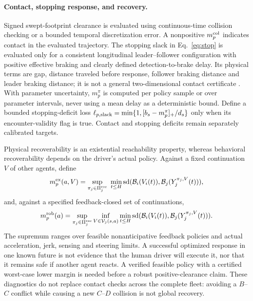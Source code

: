 \documentclass[10pt]{article}
\begin{document}
\paragraph{Contact, stopping response, and recovery.}
Signed swept-footprint clearance is evaluated using continuous-time collision checking or a bounded temporal discretization error. A nonpositive $m_p^{\rm col}$ indicates contact in the evaluated trajectory. The stopping slack in Eq.~\eqref{eq:stop} is evaluated only for a consistent longitudinal leader--follower configuration with positive effective braking and clearly defined detection-to-brake delay. Its physical terms are gap, distance traveled before response, follower braking distance and leader braking distance; it is not a general two-dimensional contact certificate \parencite{shalev2017rss,durrani2024new}. With parameter uncertainty, $m_p^\pi$ is computed per policy sample or over parameter intervals, never using a mean delay as a deterministic bound. Define a bounded stopping-deficit loss $\ell_{p,\rm slack}=\min\{1,[b_s-m_p^\pi]_+/d_s\}$ only when its encounter-validity flag is true. Contact and stopping deficits remain separately calibrated targets.

Physical recoverability is an existential reachability property, whereas behavioral recoverability depends on the driver's actual policy. Against a fixed continuation $V$ of other agents, define
\begin{equation}
 m_p^{\rm ex}(a,V)=\sup_{\pi_j\in\Pi_j^{\rm rec}}\ \min_{t\le H}
 \operatorname{sd}(\mathcal B_i(V_i(t)),\mathcal B_j(Y_j^{\pi_j,V}(t))),
 \label{eq:exrecover}
\end{equation}
and, against a specified feedback-closed set of continuations,
\begin{equation}
 m_p^{\rm rob}(a)=\sup_{\pi_j\in\Pi_j^{\rm rec}}
 \inf_{V\in\mathcal V_j(s,a)}\min_{t\le H}
 \operatorname{sd}(\mathcal B_i(V_i(t)),\mathcal B_j(Y_j^{\pi_j,V}(t))).
 \label{eq:robrecover}
\end{equation}
The supremum ranges over feasible nonanticipative feedback policies and actual acceleration, jerk, sensing and steering limits. A successful optimized response in one known future is not evidence that the human driver will execute it, nor that it remains safe if another agent reacts. A verified feasible policy with a certified worst-case lower margin is needed before a robust positive-clearance claim. These diagnostics do not replace contact checks across the complete fleet: avoiding a $B$--$C$ conflict while causing a new $C$--$D$ collision is not global recovery.
\end{document}
